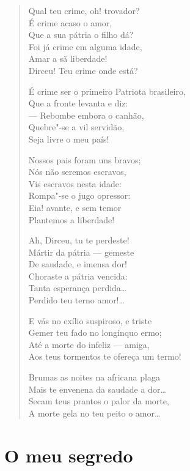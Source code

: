 \begin{verse}
Qual teu crime, oh! trovador?\\
É crime acaso o amor,\\
Que a sua pátria o filho dá?\\
Foi já crime em alguma idade,\\
Amar a sã liberdade!\\
Dirceu! Teu crime onde está?

É crime ser o primeiro Patriota brasileiro,\\
Que a fronte levanta e diz:\\
--- Rebombe embora o canhão,\\
Quebre"-se a vil servidão,\\
Seja livre o meu país!

\pagebreak

Nossos pais foram uns bravos;\\
Nós não seremos escravos,\\
Vis escravos nesta idade:\\
Rompa"-se o jugo opressor:\\
Eia! avante, e sem temor\\
Plantemos a liberdade!

Ah, Dirceu, tu te perdeste!\\
Mártir da pátria --- gemeste\\
De saudade, e imensa dor!\\
Choraste a pátria vencida:\\
Tanta esperança perdida\ldots{}\\
Perdido teu terno amor!\ldots{}

E vás no exílio suspiroso, e triste\\
Gemer teu fado no longínquo ermo;\\
Até a morte do infeliz --- amiga,\\
Aos teus tormentos te ofereça um termo!

Brumas as noites na africana plaga\\
Mais te envenena da saudade a dor\ldots{}\\
Secam teus prantos o palor da morte,\\
A morte gela no teu peito o amor\ldots{}
\end{verse}

\chapter{O meu segredo}

